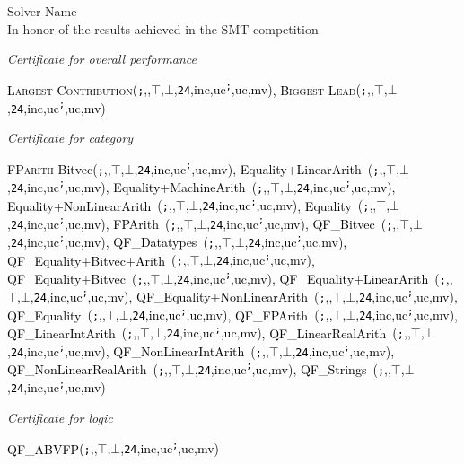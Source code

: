 \documentclass[landscape,12pt]{article}
\newcommand{\seq}{\texttt{;}}
\newcommand{\paral}{\textbardbl}
\newcommand{\sat}{$\top$}
\newcommand{\unsat}{$\bot$}
\newcommand{\fast}{\texttt{24}}
\newcommand{\inc}{inc}
\newcommand{\uc}{uc\textsuperscript}
\newcommand{\mv}{mv}
\begin{document}

{\centering
{

\begin{minipage}{\textwidth}
\centering

\end{minipage}

\begin{myframe}

\textcolor{red!10!black!90}
{\Huge Solver Name}\\

\textcolor{green!10!black!90}{
\large In honor of the results achieved in the SMT-competition}

\medskip

\textcolor{red!30!black!90}
{\textit{Certificate for overall performance}}

\newcommand{\all}{{\footnotesize (\seq,\paral,\sat,\unsat,\fast,\inc,\uc\seq,\uc\paral,\mv)}}

\textcolor{black}{\large
 \textsc{Largest Contribution}\all,
 \textsc{Biggest Lead}\all}

 \medskip
\textcolor{red!30!black!90} {\textit{Certificate for category}}

 \textcolor{black}{\large
 \textsc{FParith}
Bitvec\all,
 Equality+LinearArith~\all,
 Equality+MachineArith~\all,
 Equality+NonLinearArith~\all,
 Equality~\all,
 FPArith~\all,
 QF\_Bitvec~\all,
 QF\_Datatypes~\all,
 QF\_Equality+Bitvec+Arith~\all,
 QF\_Equality+Bitvec~\all,
 QF\_Equality+LinearArith~\all,
 QF\_Equality+NonLinearArith~\all,
 QF\_Equality~\all,
 QF\_FPArith~\all,
 QF\_LinearIntArith~\all,
 QF\_LinearRealArith~\all,
 QF\_NonLinearIntArith~\all,
 QF\_NonLinearRealArith~\all,
 QF\_Strings~\all
 }

 \medskip
 \textcolor{red!30!black!90}  {\textit{Certificate for logic}}

 \textcolor{black}{\large QF\_ABVFP\all
 }

\vspace{2mm}


\vspace{1cm}

{\color{blue!40!black}
}
\end{myframe}

}}
\end{document}
